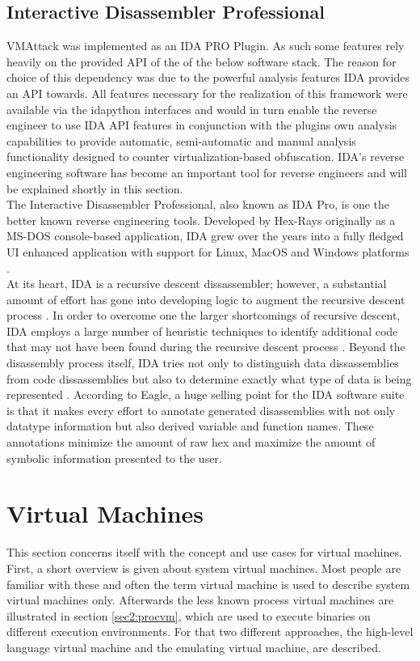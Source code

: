 \documentclass[10pt,twoside,a4paper,bibliography=totoc]{scrbook}
\begin{document}
\subsection{Interactive Disassembler Professional}
\label{sec2:ida}
VMAttack was implemented as an IDA PRO Plugin. As such some features rely heavily on the provided API of the of the below software stack. The reason for choice of this dependency was due to the powerful analysis features IDA provides an API towards. 
All features necessary for the realization of this framework were available via the idapython interfaces and would in turn enable the reverse engineer to use IDA API features in conjunction with the plugins own analysis capabilities to provide automatic, semi-automatic and manual analysis functionality designed to counter virtualization-based obfuscation. 
IDA's reverse engineering software has become an important tool for reverse engineers and will be explained shortly in this section.\\
The Interactive Disassembler Professional, also known as IDA Pro, is one the better known reverse engineering tools. Developed by Hex-Rays originally as a MS-DOS console-based application, IDA grew over the years into a fully fledged UI enhanced application with support for Linux, MacOS and Windows platforms \cite{idabook}.\\
At its heart, IDA is a recursive descent dissassembler; however, a substantial amount of effort has gone into developing logic to augment the recursive descent process \cite{idabook}. 
In order to overcome one the larger shortcomings of recursive descent, IDA employs a large number of heuristic techniques to identify additional code that may not have been found during the recursive descent process \cite{idabook}. 
Beyond the disassembly process itself, IDA tries not only to distinguish data dissassemblies from code dissassemblies but also to determine exactly what type of data is being represented . 
According to Eagle, a huge selling point for the IDA software suite is that it makes every effort to annotate generated disassemblies with not only datatype information but also derived variable and function names. 
These annotations minimize the amount of raw hex and maximize the amount of symbolic information presented to the user\cite{idabook}.


\section{Virtual Machines}
\label{sec2:virtma}
This section concerns itself with the concept and use cases for virtual machines.
First, a short overview is given about system virtual machines. Most people are familiar with these and often the term virtual machine is used to describe system virtual machines only.
Afterwards the less known process virtual machines are illustrated in section \ref{sec2:procvm}, which are used
to execute binaries on different execution environments.
For that two different approaches, the high-level language virtual machine and the emulating virtual machine, are described.
\end{document}
